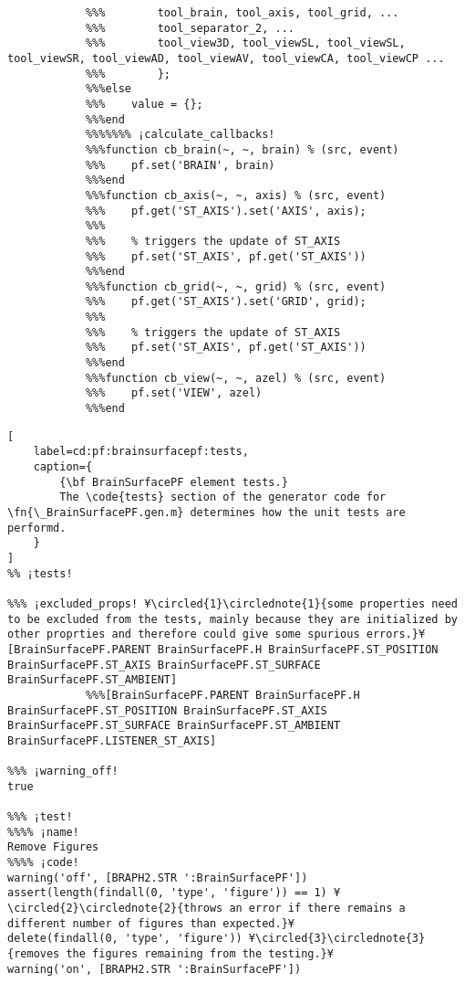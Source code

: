 \documentclass{tufte-handout}
\begin{document}
\begin{lstlisting}
            %%%        tool_brain, tool_axis, tool_grid, ...
            %%%        tool_separator_2, ...
            %%%        tool_view3D, tool_viewSL, tool_viewSL, tool_viewSR, tool_viewAD, tool_viewAV, tool_viewCA, tool_viewCP ...
            %%%        };
            %%%else
            %%%    value = {};
            %%%end
            %%%%%%% ¡calculate_callbacks!
            %%%function cb_brain(~, ~, brain) % (src, event)
            %%%    pf.set('BRAIN', brain)
            %%%end
            %%%function cb_axis(~, ~, axis) % (src, event)
            %%%    pf.get('ST_AXIS').set('AXIS', axis);
            %%%    
            %%%    % triggers the update of ST_AXIS
            %%%    pf.set('ST_AXIS', pf.get('ST_AXIS'))
            %%%end
            %%%function cb_grid(~, ~, grid) % (src, event)
            %%%    pf.get('ST_AXIS').set('GRID', grid);
            %%%
            %%%    % triggers the update of ST_AXIS
            %%%    pf.set('ST_AXIS', pf.get('ST_AXIS'))
            %%%end
            %%%function cb_view(~, ~, azel) % (src, event)
            %%%    pf.set('VIEW', azel)
            %%%end
\end{lstlisting}

\begin{lstlisting}[
	label=cd:pf:brainsurfacepf:tests,
	caption={
		{\bf BrainSurfacePF element tests.}
		The \code{tests} section of the generator code for \fn{\_BrainSurfacePF.gen.m} determines how the unit tests are performd.
	}
]
%% ¡tests!

%%% ¡excluded_props! ¥\circled{1}\circlednote{1}{some properties need to be excluded from the tests, mainly because they are initialized by other proprties and therefore could give some spurious errors.}¥
[BrainSurfacePF.PARENT BrainSurfacePF.H BrainSurfacePF.ST_POSITION BrainSurfacePF.ST_AXIS BrainSurfacePF.ST_SURFACE BrainSurfacePF.ST_AMBIENT]
            %%%[BrainSurfacePF.PARENT BrainSurfacePF.H BrainSurfacePF.ST_POSITION BrainSurfacePF.ST_AXIS BrainSurfacePF.ST_SURFACE BrainSurfacePF.ST_AMBIENT BrainSurfacePF.LISTENER_ST_AXIS] 

%%% ¡warning_off!
true

%%% ¡test!
%%%% ¡name!
Remove Figures
%%%% ¡code!
warning('off', [BRAPH2.STR ':BrainSurfacePF'])
assert(length(findall(0, 'type', 'figure')) == 1) ¥\circled{2}\circlednote{2}{throws an error if there remains a different number of figures than expected.}¥
delete(findall(0, 'type', 'figure')) ¥\circled{3}\circlednote{3}{removes the figures remaining from the testing.}¥
warning('on', [BRAPH2.STR ':BrainSurfacePF'])
\end{lstlisting}
\end{document}
